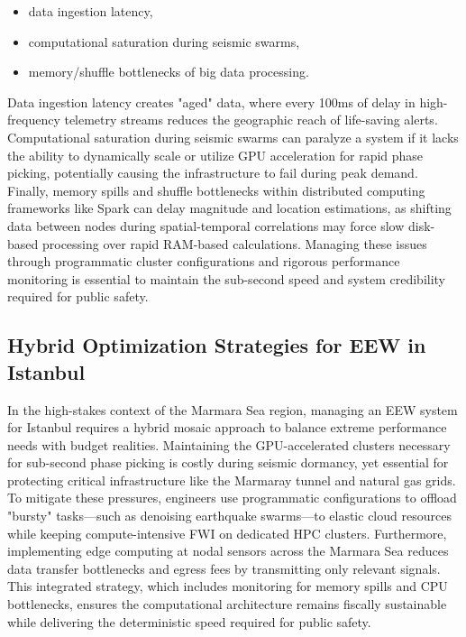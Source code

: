 \documentclass[data,article,submit,pdftex,moreauthors]{Definitions/mdpi}
\begin{document}
\begin{itemize}
\item data ingestion latency, 
\item computational saturation during seismic swarms, 
\item memory/shuffle bottlenecks of big data processing.
\end{itemize}

Data ingestion latency creates "aged" data, where every 100ms of delay in high-frequency telemetry streams reduces the geographic reach of life-saving alerts. Computational saturation during seismic swarms can paralyze a system if it lacks the ability to dynamically scale or utilize GPU acceleration for rapid phase picking, potentially causing the infrastructure to fail during peak demand. Finally, memory spills and shuffle bottlenecks within distributed computing frameworks like Spark can delay magnitude and location estimations, as shifting data between nodes during spatial-temporal correlations may force slow disk-based processing over rapid RAM-based calculations. Managing these issues through programmatic cluster configurations and rigorous performance monitoring is essential to maintain the sub-second speed and system credibility required for public safety.

\subsection{Hybrid Optimization Strategies for EEW in Istanbul}

In the high-stakes context of the Marmara Sea region, managing an EEW system for Istanbul requires a hybrid mosaic approach to balance extreme performance needs with budget realities. Maintaining the GPU-accelerated clusters necessary for sub-second phase picking is costly during seismic dormancy, yet essential for protecting critical infrastructure like the Marmaray tunnel and natural gas grids. To mitigate these pressures, engineers use programmatic configurations to offload "bursty" tasks—such as denoising earthquake swarms—to elastic cloud resources while keeping compute-intensive FWI on dedicated HPC clusters. Furthermore, implementing edge computing at nodal sensors across the Marmara Sea reduces data transfer bottlenecks and egress fees by transmitting only relevant signals. This integrated strategy, which includes monitoring for memory spills and CPU bottlenecks, ensures the computational architecture remains fiscally sustainable while delivering the deterministic speed required for public safety.
\end{document}
